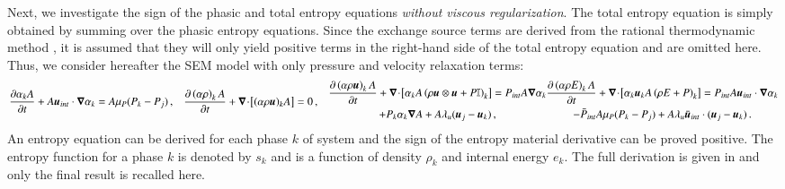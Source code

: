 \documentclass[preprint,10pt]{elsarticle}
\begin{document}
Next, we investigate the sign of the phasic and total entropy equations \emph{without viscous regularization}. The total entropy equation is simply 
obtained by summing over the phasic entropy equations. Since the exchange source terms are derived from the rational thermodynamic method 
\cite{BaerNunziato, PassmanNunziato}, it is assumed that they will only yield positive terms in the right-hand side of the total entropy 
equation and are omitted here. Thus, we consider hereafter the SEM model with only pressure and velocity relaxation terms:
\begin{subequations}\label{eq:liq-7-eqn-sect5_no_exchange}
\begin{align}
  \label{eqn:multi-d-7-eqn-liq-vol_no_exchange}
  \frac{\partial \alpha_{k} A}{\partial t} + A\mbold u_{int} \cdot \grad \alpha_{k}
  &= A \mu_P (P_{k} - P_{j}) \,,
\end{align}
\begin{align}
  \label{multi-d-7-equ-liq_no_exchange}
  \frac{\partial \left( \alpha \rho \right)_{k} A}{\partial t}
  + \div \left[ (\alpha \rho \mbold u)_{k} A \right]
  &= 0 \,,
\end{align}
\begin{multline}
  \frac{\partial \left( \alpha \rho \mbold u \right)_{k} A}{\partial t}
  + \div \left[ \alpha_{k} A \left( \rho \mbold u \otimes \mbold u + P \mathbb{I} \right)_{k} \right]
  = P_{int} A \grad \alpha_{k} \\ + P_{k} \alpha_{k} \grad A
  + A \lambda_u (\mbold u_{j} - \mbold u_{k})\,,
\end{multline}
\begin{multline}
  \frac{\partial \left( \alpha \rho E \right)_{k} A}{\partial t}
  + \div \left[ \alpha_{k} \mbold u_{k} A \left( \rho E + P \right)_{k} \right]
  = P_{int} A \mbold u_{int} \cdot \grad \alpha_{k} \\ - \bar{P}_{int} A \mu_P (P_{k} - P_{j})
  + A \lambda_u \bar{\mbold u}_{int} \cdot (\mbold u_{j} - \mbold u_{k}) \,.
\end{multline}
\end{subequations}
%
An entropy equation can be derived for each phase $k$ of system 
%
and the sign of the entropy material derivative can be proved positive. The entropy function for a phase $k$ is denoted by $s_k$ and is a function of 
density $\rho_k$ and internal energy $e_k$. The full derivation is given in  and only the final result is recalled here. 
\end{document}
